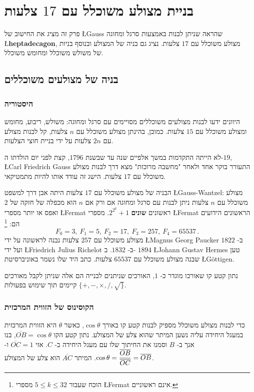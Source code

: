 

\chapter{בניית מצולע משוכלל עם 
$17$
צלעות}
\label{c.heptadecagon}


פרק זה מציג את החישוב של 
\L{Gauss}
שהראה שניתן לבנות  באמצעות סרגל ומחוגה
\L{\textbf{heptadecagon}},
מצולע משוכלל עם 
$17$
צלעות.
נציג גם בניה של המצולע ובנוסף בניות של משולש משוכלל ומחומש משוכלל.

\section{בניה של מצולעים משוכללים}

\subsection{היסטוריה}
היוונים ידעו לבנות מצולעים משוכללים מסויימים  עם סרגל ומחוגה: משולש, ריבוע, מחומש ומצולע משוכלל עם $15$ צלעות.
כמובן, בהינתן מצולע משוכלל עם
$n$
צלעות, קל לבנות מצולע עם 
$2n$
צלעות על ידי בניית חוצי הצלעות.

לא הייתה התקדמות במשך אלפיים שנה עד שבשנת
$1796$,
קצת לפני יום הולדתו ה-$19$,
\L{Carl Friedrich Gauss}
התעורר בוקר אחד ולאחר "מחשבה מרוכזת" מצא דרך לבנות מצולע משוכלל עם 
$17$
צלעות. הישג זה עודד אותו להיות מתמטיקאי.

הבניה של מצולע משוכלל עם 
$17$
צלעות היתה אבן דרך למשפט
\L{Gauss-Wantzel}:
מצולע משוכלל עם 
$n$
צלעות ניתן לבנות עם סרגל ומחוגה אם ורק אם 
$n$
הוא מכפלה של חזקה של
$2$
ואפס או יותר מספרי 
\L{Fermat}
ראשונים
\textbf{שונים}
$2^{2^k}+1$.
מספרי 
\L{Fermat}
הראשונים הידועים הם:%
\footnote{%
הוכח שעבור
$5\leq k \leq 32$
מספרי 
\L{Fermat}
אינם ראשוניים.}
\[
F_0=3,\: F_1=5,\: F_2=17,\: F_3=257,\: F_4=65537\,.
\]
מצולע משוכלל עם
$257$
צלעות נבנה לראשונה על ידי
\L{Magnus Georg Paucker}
ב-%
$1822$
ועל ידי
\L{Friedrich Julius Richelot}
ב-%
$1832$.
ב-%
$1894$
\L{Johann Gustav Hermes}
טען שבנה מצולע משוכלל עם
$65537$
צלעות.
כתב היד שלו נשמר באוניברסיטת 
\L{G\"{o}ttigen}.

נתון קטע קו שאורכו מוגדר כ-%
$1$,
האורכים שניתנים לבנייה הם אלה שניתן לקבל מאורכים קיימים תוך שימוש בפעולות 
$\{+,-,\times,/,\surd\}$.

\subsection{הקוסינוס של הזווית המרכזית}
כדי לבנות מצולע משוכלל מספיק לבנות קטע קו באורך 
$\cos \theta$,
כאשר
$\theta$ 
היא הזווית המרכזית במעגל היחידה עליה נשען המיתר שהוא צלע של המצולע. נתון קטע הקו
$\overline{OB}=\cos\theta$,
בנו אנך ב-%
$B$
וסמנו את החיתוך שלו עם מעגל היחידה ב-%
$C$.
אזי
$\overline{OC}=1$
ו-%
$\cos \theta=\displaystyle\frac{\overline{OB}}{\overline{OC}}=\overline{OB}$.
המיתר 
$\overline{AC}$
הוא צלע של המצולע.

